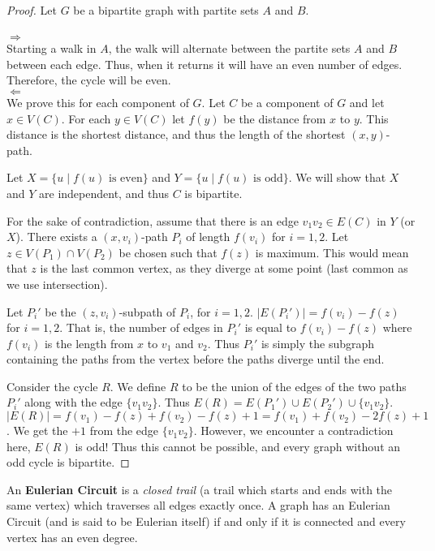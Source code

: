 \begin{proof}
	Let $G$ be a bipartite graph with partite sets $A$ and $B$.\\\\
	\noindent
	$\Rightarrow$\\
	\noindent
	Starting a walk in $A$, the walk will alternate between the partite sets $A$ and $B$ between each edge. Thus, when it returns it will have an even number of edges. Therefore, the cycle will be even.\\
	\noindent
	$\Leftarrow$\\
	\noindent
	We prove this for each component of $G$.
	Let $C$ be a component of $G$ and let $x \in V(C)$. For each $y \in V(C)$ let $f(y)$ be the distance from $x$ to $y$. This distance is the shortest distance, and thus the length of the shortest $(x,y)$-path.

	Let $X = \{u \mid f(u) \text{ is even}\}$ and $Y= \{u \mid f(u) \text{ is odd}\}$. We will show that $X$ and $Y$ are independent, and thus $C$ is bipartite.

	For the sake of contradiction, assume that there is an edge $v_{1}v_{2} \in E(C)$ in $Y$ (or $X$). There exists  a $(x,v_{i})$-path $P_{i}$ of length $f(v_{i})$ for $i = 1,2$. Let $z \in V(P_{1}) \cap V(P_2)$ be chosen such that $f(z)$ is maximum. This would mean that $z$ is the last common vertex, as they diverge at some point (last common as we use intersection).

	Let $P_{i}'$ be the $(z,v_{i})$-subpath of $P_{i}$, for $i = 1,2$. $|E(P_{i}')| = f(v_{i}) - f(z)$ for $i = 1,2$. That is, the number of edges in $P_{i}'$ is equal to $f(v_{i}) - f(z)$ where $f(v_{i})$ is the length from $x$ to $v_{1}$ and $v_{2}$. Thus $P_{i}'$ is simply the subgraph containing the paths from the vertex before the paths diverge until the end.

	Consider the cycle $R$. We define $R$ to be the union of the edges of the two paths $P_{i}'$ along with the edge $\{v_{1}v_{2}\}$.  Thus $E(R) = E(P_{1}') \cup E(P_{2}') \cup \{v_{1}v_{2}\}$. $|E(R)| = f(v_{1}) - f(z) + f(v_{2}) - f(z) + 1 = f(v_{1}) + f(v_{2}) - 2f(z) + 1$. We get the $+1$ from the edge $\{v_{1}v_{2}\}$. However, we encounter a contradiction here, $E(R)$ is odd! Thus this cannot be possible, and every graph without an odd cycle is bipartite.
\end{proof}

An \textbf{Eulerian Circuit} is a \textit{closed trail} (a trail which starts and ends with the same vertex) which traverses all edges exactly once. A graph has an Eulerian Circuit (and is said to be Eulerian itself) if and only if it is connected and every vertex has an even degree.

